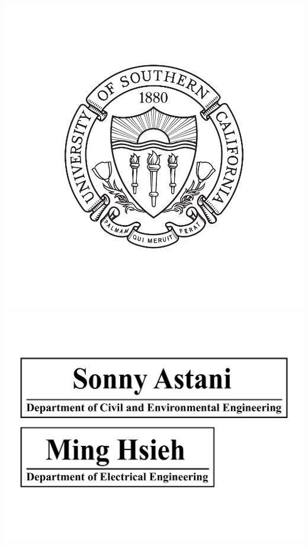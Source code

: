 \begin{titlepage}
\begin{center}


\includegraphics[scale = 0.4]{./USCsealblack.pdf}\\[0.5cm]
\includegraphics[scale = 0.25]{./ming}\\[0.5cm]

\end{center}
\end{titlepage}
